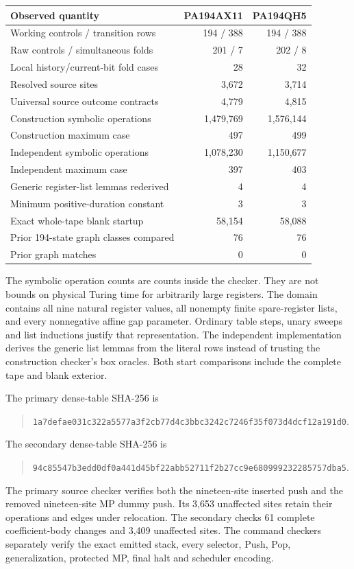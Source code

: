 \begin{center}\small
\begin{tabular}{@{}lrr@{}}\toprule
Observed quantity & PA194AX11 & PA194QH5\\\midrule
Working controls / transition rows &194 / 388&194 / 388\\
Raw controls / simultaneous folds &201 / 7&202 / 8\\
Local history/current-bit fold cases &28&32\\
Resolved source sites &3,672&3,714\\
Universal source outcome contracts &4,779&4,815\\
Construction symbolic operations &1,479,769&1,576,144\\
Construction maximum case &497&499\\
Independent symbolic operations &1,078,230&1,150,677\\
Independent maximum case &397&403\\
Generic register-list lemmas rederived &4&4\\
Minimum positive-duration constant &3&3\\
Exact whole-tape blank startup &58,154&58,088\\
Prior 194-state graph classes compared &76&76\\
Prior graph matches &0&0\\\bottomrule
\end{tabular}
\end{center}

The symbolic operation counts are counts inside the checker. They are
not bounds on physical Turing time for arbitrarily large registers.
The domain contains all nine natural register values, all nonempty finite
spare-register lists, and every nonnegative affine gap parameter. Ordinary
table steps, unary sweeps and list inductions justify that representation.
The independent implementation derives the generic list lemmas from the
literal rows instead of trusting the construction checker's box oracles.
Both start comparisons include the complete tape and blank exterior.

The primary dense-table SHA-256 is
\begin{quote}\small\nolinkurl{1a7defae031c322a5577a3f2cb77d4c3bbc3242c7246f35f073d4dcf12a191d0}.\end{quote}
The secondary dense-table SHA-256 is
\begin{quote}\small\nolinkurl{94c85547b3edd0df0a441d45bf22abb52711f2b27cc9e680999232285757dba5}.\end{quote}

The primary source checker verifies both the nineteen-site inserted push
and the removed nineteen-site MP dummy push. Its 3,653 unaffected sites
retain their operations and edges under relocation. The secondary checks
61 complete coefficient-body changes and 3,409 unaffected sites. The
command checkers separately verify the exact emitted stack, every selector,
Push, Pop, generalization, protected MP, final halt and scheduler encoding.
